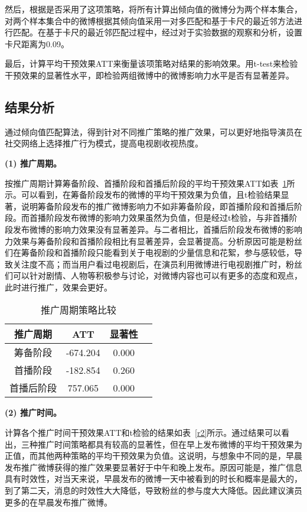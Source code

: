 然后，根据是否采用了这项策略，将所有计算出倾向值的微博分为两个样本集合，对两个样本集合中的微博根据其倾向值采用一对多匹配和基于卡尺的最近邻方法进行匹配。在基于卡尺的最近邻匹配过程中，经过对于实验数据的观察和分析，设置卡尺距离为0.09。

最后，计算平均干预效果ATT来衡量该项策略对结果的影响效果。用t-test来检验干预效果的显著性水平，即检验两组微博中的微博影响力水平是否有显著差异。

\subsection{结果分析}

通过倾向值匹配算法，得到针对不同推广策略的推广效果，可以更好地指导演员在社交网络上选择推广行为模式，提高电视剧收视热度。

\textbf{(1) 推广周期。}

按推广周期计算筹备阶段、首播阶段和首播后阶段的平均干预效果ATT如表~\ref{r1}所示。可以看到，在筹备阶段发布的微博的平均干预效果为负值，且t检验结果显著，说明筹备阶段发布的推广微博影响力不如非筹备阶段，即首播阶段和首播后阶段。而首播阶段发布微博的影响力效果虽然为负值，但是经过t检验，与非首播阶段发布微博的影响力效果没有显著差异。与二者相比，首播后阶段发布微博的影响力效果与筹备阶段和首播阶段相比有显著差异，会显著提高。分析原因可能是粉丝们在筹备阶段和首播阶段只能看到关于电视剧的少量信息和花絮，参与感较低，导致关注度不高；而当用户看过电视剧后，在演员利用微博进行电视剧推广时，粉丝们可以针对剧情、人物等积极参与讨论，对微博内容也可以有更多的态度和观点，此时进行推广，效果会更好。

\begin{table}[h]
\centering
\caption{推广周期策略比较}
\label{r1}
\begin{tabular}{|c|c|c|c|} \hline
推广周期 & ATT & 显著性\\ \hline
筹备阶段 & -674.204& 0.000\\ \hline
首播阶段 & -182.854& 0.260\\ \hline
首播后阶段 & 757.065 & 0.000\\ 
\hline\end{tabular}

\end{table}

\textbf{(2) 推广时间。}

计算各个推广时间干预效果ATT和t检验的结果如表~\ref{r2}所示。通过结果可以看出，三种推广时间策略都具有较高的显著性，但在早上发布微博的平均干预效果为正值，而其他两种策略的平均干预效果为负值。这说明，与想象中不同的是，早晨发布推广微博获得的推广效果要显著好于中午和晚上发布。原因可能是，推广信息具有时效性，对当天来说，早晨发布的微博一天中被看到的时长和概率是最大的，到了第二天，消息的时效性大大降低，导致粉丝的参与度大大降低。因此建议演员更多的在早晨发布推广微博。

